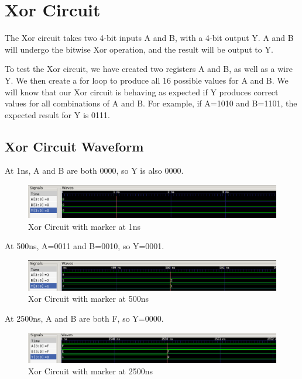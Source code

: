 \documentclass[12pt]{article}
\begin{document}
\section{Xor Circuit}
The Xor circuit takes two 4-bit inputs A and B, with a 4-bit output Y. A and B will undergo the bitwise Xor operation, and the result will be output to Y.
 

To test the Xor circuit, we have created two registers A and B, as well as a wire Y. We then create a for loop to produce all 16 possible values for A and B. We will know that our Xor circuit is behaving as expected if Y produces correct values for all combinations of A and B. For example, if A=1010 and B=1101, the expected result for Y is 0111. 
 

\subsection{Xor Circuit Waveform} 

At 1ns, A and B are both 0000, so Y is also 0000.
\begin{figure}[H]
 \centering
 \includegraphics[width = 1.0\textwidth]{Xor/xor_wave.png}
 \caption{Xor Circuit with marker at 1ns}
 \label{fig:enter-label} 
\end{figure} 

At 500ns, A=0011 and B=0010, so Y=0001.
 \begin{figure}[H]
 \centering 
\includegraphics[width = 1.0\textwidth]{Xor/xor_wave1.png}
 \caption{Xor Circuit with marker at 500ns}
 \label{fig:enter-label}
 \end{figure}

At 2500ns, A and B are both F, so Y=0000.
 \begin{figure}[H]
 \centering 
\includegraphics[width = 1.0\textwidth]{Xor/xor_wave2.png}
 \caption{Xor Circuit with marker at 2500ns}
 \label{fig:enter-label}
 \end{figure}
\end{document}
